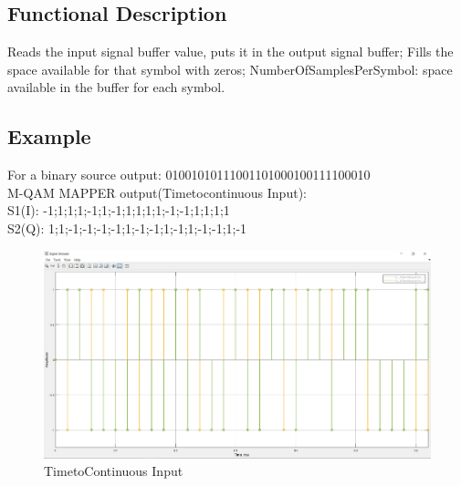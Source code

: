 



\subsection*{Functional Description}
Reads the input signal buffer value, puts it in the output signal buffer;
Fills the space available for that symbol with zeros;
NumberOfSamplesPerSymbol:  space available in the buffer for each symbol.

\subsection*{Example}

For a binary source output: 01001010111001101000100111100010 \\
M-QAM MAPPER output(Timetocontinuous Input): \\
S1(I): -1;1;1;1;-1;1;-1;1;1;1;1;-1;-1;1;1;1;1\\
S2(Q): 1;1;-1;-1;-1;-1;1;-1;-1;1;-1;1;-1;-1;1;-1\\
		
\begin{figure}[h]
	\centering
	\includegraphics[width=1\textwidth]{../lib/discrete_to_continuous_time/figures/S1_S2.pdf}
	\caption{TimetoContinuous Input}\label{fig:TimetoContinuous Input}
\end{figure}

